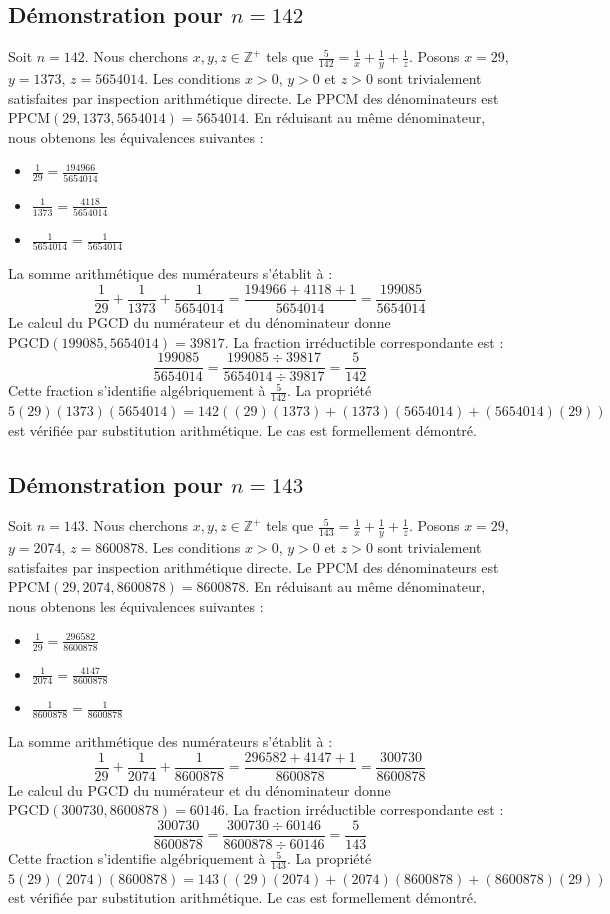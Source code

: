 \documentclass[12pt,a4paper]{article}
\begin{document}
\subsection{Démonstration pour $n = 142$}
Soit $n = 142$. Nous cherchons $x, y, z \in \mathbb{Z}^{+}$ tels que $\frac{5}{142} = \frac{1}{x} + \frac{1}{y} + \frac{1}{z}$.
Posons $x = 29$, $y = 1373$, $z = 5654014$.
Les conditions $x > 0$, $y > 0$ et $z > 0$ sont trivialement satisfaites par inspection arithmétique directe.
Le PPCM des dénominateurs est $\text{PPCM}(29, 1373, 5654014) = 5654014$.
En réduisant au même dénominateur, nous obtenons les équivalences suivantes :
\begin{itemize}
    \item $\frac{1}{29} = \frac{194966}{5654014}$
    \item $\frac{1}{1373} = \frac{4118}{5654014}$
    \item $\frac{1}{5654014} = \frac{1}{5654014}$
\end{itemize}
La somme arithmétique des numérateurs s'établit à :
$$ \frac{1}{29} + \frac{1}{1373} + \frac{1}{5654014} = \frac{194966 + 4118 + 1}{5654014} = \frac{199085}{5654014} $$
Le calcul du PGCD du numérateur et du dénominateur donne $\text{PGCD}(199085, 5654014) = 39817$.
La fraction irréductible correspondante est :
$$ \frac{199085}{5654014} = \frac{199085 \div 39817}{5654014 \div 39817} = \frac{5}{142} $$
Cette fraction s'identifie algébriquement à $\frac{5}{142}$.
La propriété $5(29)(1373)(5654014) = 142((29)(1373) + (1373)(5654014) + (5654014)(29))$ est vérifiée par substitution arithmétique.
Le cas est formellement démontré.

\subsection{Démonstration pour $n = 143$}
Soit $n = 143$. Nous cherchons $x, y, z \in \mathbb{Z}^{+}$ tels que $\frac{5}{143} = \frac{1}{x} + \frac{1}{y} + \frac{1}{z}$.
Posons $x = 29$, $y = 2074$, $z = 8600878$.
Les conditions $x > 0$, $y > 0$ et $z > 0$ sont trivialement satisfaites par inspection arithmétique directe.
Le PPCM des dénominateurs est $\text{PPCM}(29, 2074, 8600878) = 8600878$.
En réduisant au même dénominateur, nous obtenons les équivalences suivantes :
\begin{itemize}
    \item $\frac{1}{29} = \frac{296582}{8600878}$
    \item $\frac{1}{2074} = \frac{4147}{8600878}$
    \item $\frac{1}{8600878} = \frac{1}{8600878}$
\end{itemize}
La somme arithmétique des numérateurs s'établit à :
$$ \frac{1}{29} + \frac{1}{2074} + \frac{1}{8600878} = \frac{296582 + 4147 + 1}{8600878} = \frac{300730}{8600878} $$
Le calcul du PGCD du numérateur et du dénominateur donne $\text{PGCD}(300730, 8600878) = 60146$.
La fraction irréductible correspondante est :
$$ \frac{300730}{8600878} = \frac{300730 \div 60146}{8600878 \div 60146} = \frac{5}{143} $$
Cette fraction s'identifie algébriquement à $\frac{5}{143}$.
La propriété $5(29)(2074)(8600878) = 143((29)(2074) + (2074)(8600878) + (8600878)(29))$ est vérifiée par substitution arithmétique.
Le cas est formellement démontré.
\end{document}
